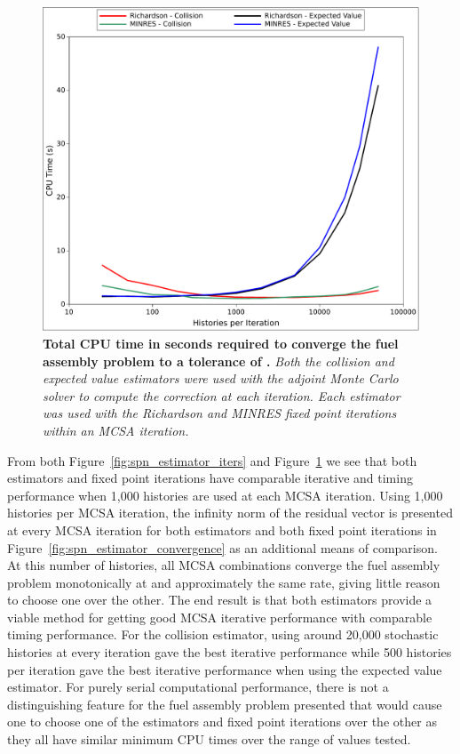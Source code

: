 \begin{figure}[t!]
  \begin{center}
    \includegraphics[width=6in]{chapters/spn_equations/estimator_time.pdf}
  \end{center}
  \caption{\textbf{Total CPU time in seconds required to converge the
      fuel assembly problem to a tolerance of .}
    \textit{Both the collision and expected value estimators were used
      with the adjoint Monte Carlo solver to compute the correction at
      each iteration. Each estimator was used with the Richardson and
      MINRES fixed point iterations within an MCSA iteration.}}
  \label{fig:spn_estimator_time}
\end{figure}

From both Figure~\ref{fig:spn_estimator_iters} and
Figure~\ref{fig:spn_estimator_time} we see that both estimators and
fixed point iterations have comparable iterative and timing
performance when 1,000 histories are used at each MCSA
iteration. Using 1,000 histories per MCSA iteration, the infinity norm
of the residual vector is presented at every MCSA iteration for both
estimators and both fixed point iterations in
Figure~\ref{fig:spn_estimator_convergence} as an additional means of
comparison. At this number of histories, all MCSA combinations
converge the fuel assembly problem monotonically at and approximately
the same rate, giving little reason to choose one over the other. The
end result is that both estimators provide a viable method for getting
good MCSA iterative performance with comparable timing
performance. For the collision estimator, using around 20,000
stochastic histories at every iteration gave the best iterative
performance while 500 histories per iteration gave the best iterative
performance when using the expected value estimator. For purely serial
computational performance, there is not a distinguishing feature for
the fuel assembly problem presented that would cause one to choose one
of the estimators and fixed point iterations over the other as they
all have similar minimum CPU times over the range of values tested.

